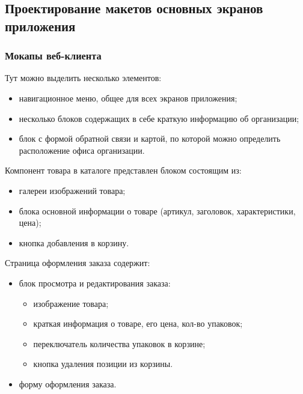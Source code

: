 \subsection{Проектирование макетов основных экранов приложения}\label{subsec:2-design-mockups}\indent

\subsubsection{Мокапы веб-клиента}\indent


Тут можно выделить несколько элементов:
\begin{itemize}
    \item навигационное меню, общее для всех экранов приложения;
    \item несколько блоков содержащих в себе краткую информацию об организации;
    \item блок с формой обратной связи и картой, по которой можно определить расположение офиса организации.
\end{itemize}


Компонент товара в каталоге представлен блоком состоящим из:

\begin{itemize}
    \item галереи изображений товара;
    \item блока основной информации о товаре (артикул, заголовок, характеристики, цена);
    \item кнопка добавления в корзину.
\end{itemize}


Страница оформления заказа содержит:

\begin{itemize}
    \item блок просмотра и редактирования заказа:
    \begin{itemize}
        \item изображение товара;
        \item краткая информация о товаре, его цена, кол-во упаковок;
        \item переключатель количества упаковок в корзине;
        \item кнопка удаления позиции из корзины.
    \end{itemize}
    \item форму оформления заказа.
\end{itemize}

